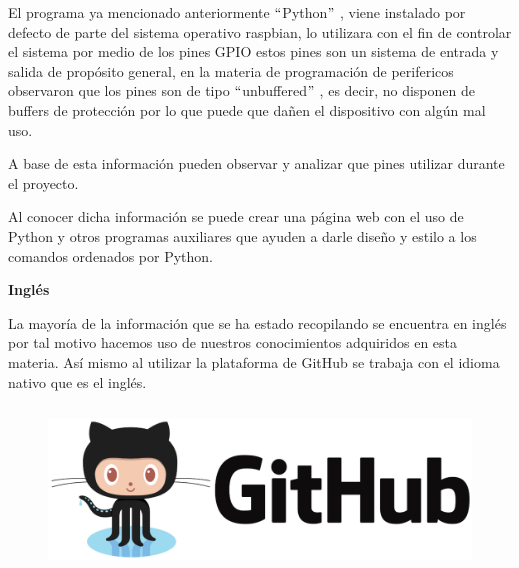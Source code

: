 \documentclass[12pt]{article}
\begin{document}
\vspace{\baselineskip}
El programa ya mencionado anteriormente $``$Python$"$ , viene instalado por defecto de parte del sistema operativo raspbian, lo utilizara con el fin de controlar el sistema por medio de los pines GPIO estos pines son un sistema de entrada y salida de propósito general, en la materia de programación de perifericos observaron que los pines son de tipo $``$unbuffered$"$ , es decir, no disponen de buffers de protección por lo que puede que dañen el dispositivo con algún mal uso.\par

A base de esta información pueden observar y analizar que pines utilizar durante el proyecto.\par

Al conocer dicha información se puede crear una página web con el uso de Python y otros programas auxiliares que ayuden a darle diseño y estilo a los comandos ordenados por Python.\par


\vspace{\baselineskip}

\vspace{\baselineskip}

\vspace{\baselineskip}

\vspace{\baselineskip}

\vspace{\baselineskip}

\vspace{\baselineskip}

\vspace{\baselineskip}
\newpage
\textbf{Inglés}\par

La mayoría de la información que se ha estado recopilando se encuentra en inglés por tal motivo hacemos uso de nuestros conocimientos adquiridos en esta materia. Así mismo al utilizar la plataforma de GitHub se trabaja con el idioma nativo que es el inglés. \par




\begin{figure}[H]
	\begin{Center}
		\includegraphics[width=5.23in,height=1.74in]{./media/image6.png}
	\end{Center}
\end{figure}
\end{document}
